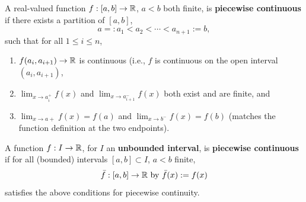 \begin{tcolorbox}[colback=mylightblue, title = {\bf Piecewise Continuity}, breakable]
\begin{definition}
\label{def:piecewiseContinuous}
A real-valued function $f:[a, b] \to  \mathbb R$, $a < b $ both finite, is \textbf{piecewise continuous} if there exists a partition of $[a, b]$, 
\begin{equation}
    a=:a_1 < a_2 < \cdots < a_{n+1}:=b,
\end{equation}
such that for all $1 \le i \le n$,
\begin{enumerate}
\renewcommand{\labelenumi}{(\alph{enumi})}
\setlength{\itemsep}{.2cm}
    \item $f(a_i, a_{i+1}) \to \mathbb R $ is continuous (i.e., $f$ is continuous on the open interval $(a_i, a_{i+1})$,  
    \item $\displaystyle \lim_{x \to a_i^+} f(x)$ and $\displaystyle \lim_{x \to a_{i+1}^-} f(x)$ both exist and are finite, and
    \item $\displaystyle \lim_{x \to a+} f(x) = f(a)$ and $\displaystyle \lim_{x \to b^-} f(x) = f(b)$ (matches the function definition at the two endpoints).
\end{enumerate}

\bigskip
A function $f:I\to \mathbb R$, for $I$ an \textbf{unbounded interval}, is \textbf{piecewise continuous} if for all (bounded) intervals $[a, b] \subset I$, $a < b$ finite,
    $$ \bar{f}:[a, b] \to \mathbb R \text{ by } \bar{f}(x) :=f(x) $$
satisfies the above conditions for piecewise continuity. 


\end{definition}
\end{tcolorbox}
